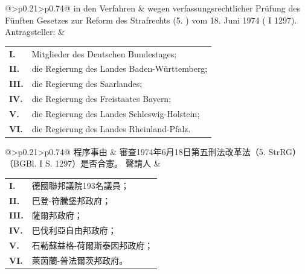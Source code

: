 \documentclass[12pt]{article}
\begin{document}
\syncleft
\begin{sourcepara}
{\footnotesize
\renewcommand{\arraystretch}{1.08}%
\begin{tabular}{@{}>{\RaggedRight\arraybackslash}p{0.21\linewidth}>{\RaggedRight\arraybackslash}p{0.74\linewidth}@{}}
in den Verfahren &
wegen verfassungsrechtlicher Prüfung des Fünften Gesetzes zur Reform des Strafrechts
(5. \abbrStrRG{}) vom 18. Juni 1974 (\abbrBGBl{} I \abbrS{} 1297).
\tabularnewline[0.36em]
Antragsteller: &
\begin{tabular}[t]{@{}>{\bfseries}p{1.7em}@{}>{\RaggedRight\arraybackslash}p{\dimexpr\linewidth-1.7em\relax}@{}}
I. & 193 Mitglieder des Deutschen Bundestages;\\
II. & die Regierung des Landes Baden-Württemberg;\\
III. & die Regierung des Saarlandes;\\
IV. & die Regierung des Freistaates Bayern;\\
V. & die Regierung des Landes Schleswig-Holstein;\\
VI. & die Regierung des Landes Rheinland-Pfalz.
\end{tabular}
\end{tabular}
\par}
\end{sourcepara}
\begin{transpara}
{\footnotesize
\renewcommand{\arraystretch}{1.08}%
\begin{tabular}{@{}>{\RaggedRight\arraybackslash}p{0.21\linewidth}>{\RaggedRight\arraybackslash}p{0.74\linewidth}@{}}
程序事由 &
審查1974年6月18日第五刑法改革法（5. StrRG）（BGBl. I S. 1297）是否合憲。
\tabularnewline[0.36em]
聲請人 &
\begin{tabular}[t]{@{}>{\bfseries}p{1.7em}@{}>{\RaggedRight\arraybackslash}p{\dimexpr\linewidth-1.7em\relax}@{}}
I. & 德國聯邦議院193名議員；\\
II. & 巴登-符騰堡邦政府；\\
III. & 薩爾邦政府；\\
IV. & 巴伐利亞自由邦政府；\\
V. & 石勒蘇益格-荷爾斯泰因邦政府；\\
VI. & 萊茵蘭-普法爾茨邦政府。
\end{tabular}
\end{tabular}
\par}
\end{transpara}
\end{document}
